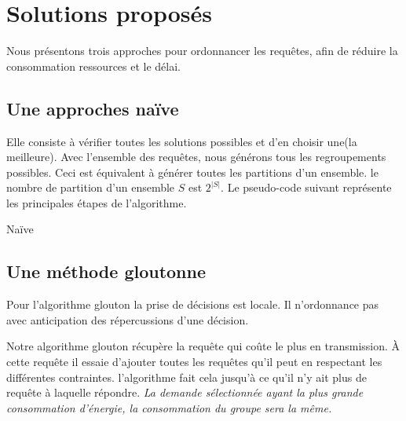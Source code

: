\documentclass[runningheads]{llncs}
\begin{document}
\section{Solutions propos\'es }
Nous présentons trois approches pour ordonnancer les requêtes, afin de 
réduire la consommation ressources et le délai.

\subsection{Une approches na\"ive }
Elle consiste à vérifier toutes les solutions possibles et d'en choisir une(la meilleure).
Avec l'ensemble des requêtes, nous générons tous les regroupements possibles.
Ceci est équivalent à générer toutes les partitions d'un ensemble.
le nombre de partition d'un ensemble $S$ est $2^{|S|}$.
Le pseudo-code suivant représente les principales étapes de l'algorithme.
\begin{algorithm}[H]
    \caption{Na\"ive}%
    \label{alg:naive}
    \begin{algorithmic}[1]
        \EndFor{}
        
    
    \end{algorithmic}
\end{algorithm}


  
\subsection{Une m\'ethode gloutonne}
Pour l'algorithme glouton la prise de décisions  est locale. 
Il n'ordonnance pas avec anticipation des répercussions d'une décision.

Notre algorithme glouton récupère la requête qui coûte le plus en transmission.
À cette requête il essaie d'ajouter toutes les requêtes qu'il peut en respectant 
les différentes contraintes. 
l'algorithme fait cela jusqu'à ce qu'il n'y ait plus de requête à laquelle répondre.
\emph{La demande sélectionnée ayant la plus grande consommation d'énergie, 
la consommation du groupe sera la même.}
\end{document}
